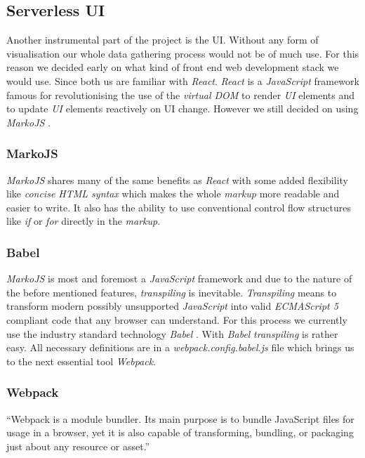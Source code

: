 \subsection{Serverless UI}

Another instrumental part of the project is the UI. Without any form of visualisation our whole data
gathering process would not be of much use. For this reason we decided early on what kind of front
end web development stack we would use. Since both us are familiar with \textit{React}.
\textit{React} is a \textit{JavaScript} framework famous for revolutionising the use of the
\textit{virtual DOM} to render \textit{UI} elements and to update \textit{UI} elements reactively on
UI change. However we still decided on using \textit{MarkoJS} \cite{marko}.

\subsubsection{MarkoJS}

\textit{MarkoJS} shares many of the same benefits as \textit{React} with some added flexibility like
\textit{concise HTML syntax} which makes the whole \textit{markup} more readable and easier to
write. It also has the ability to use conventional control flow structures like \textit{if} or
\textit{for} directly in the \textit{markup}.

\subsubsection{Babel}

\textit{MarkoJS} is most and foremost a \textit{JavaScript} framework and due to the nature of the
before mentioned features, \textit{transpiling} is inevitable. \textit{Transpiling} means to
transform modern possibly unsupported \textit{JavaScript} into valid \textit{ECMAScript 5} compliant
code that any browser can understand. For this process we currently use the industry standard
technology \textit{Babel} \cite{babel}. With \textit{Babel} \textit{transpiling} is rather easy. All
necessary definitions are in a \textit{webpack.config.babel.js} file which brings us to the next
essential tool \textit{Webpack}.

\subsubsection{Webpack}
\label{sec:webpack}

“Webpack is a module bundler. Its main purpose is to bundle JavaScript files for usage in a browser,
yet it is also capable of transforming, bundling, or packaging just about any resource or asset.”
\cite{webpack}

